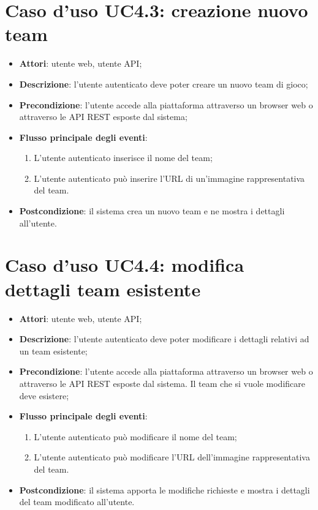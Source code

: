 \section{Caso d'uso UC4.3: creazione nuovo team}
\begin{itemize}
\item \textbf{Attori}: utente web, utente API;
\item \textbf{Descrizione}: l'utente autenticato deve poter creare un nuovo team di gioco; 
      \item \textbf{Precondizione}: l'utente accede alla piattaforma attraverso un browser web o attraverso le API REST esposte dal sistema;

        \item \textbf{Flusso principale degli eventi}:
          \begin{enumerate}
          \item L'utente autenticato inserisce il nome del team;
          \item L'utente autenticato può inserire l'URL di un'immagine rappresentativa del team.

      \end{enumerate}
    \item \textbf{Postcondizione}: il sistema crea un nuovo team e ne mostra i dettagli all'utente.
  \end{itemize}
\hypertarget{UC4.4}{}
\section{Caso d'uso UC4.4: modifica dettagli team esistente}
\begin{itemize}
\item \textbf{Attori}: utente web, utente API;
\item \textbf{Descrizione}: l'utente autenticato deve poter modificare i dettagli relativi ad un team esistente; 
      \item \textbf{Precondizione}: l'utente accede alla piattaforma attraverso un browser web o attraverso le API REST esposte dal sistema. Il team che si vuole modificare deve esistere;

        \item \textbf{Flusso principale degli eventi}:
          \begin{enumerate}
          \item L'utente autenticato può modificare il nome del team;
          \item L'utente autenticato può modificare l'URL dell'immagine rappresentativa del team.

      \end{enumerate}
    \item \textbf{Postcondizione}: il sistema apporta le modifiche richieste e mostra i dettagli del team modificato all'utente.
  \end{itemize}
\hypertarget{UC4.5}{}
